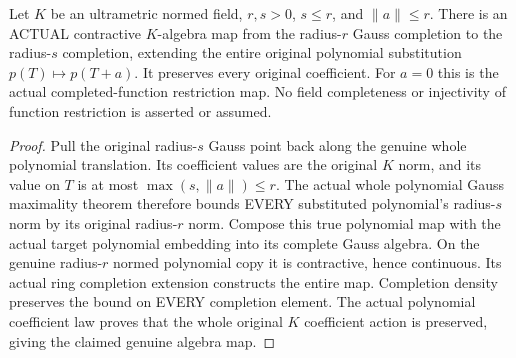 \begin{theorem}
\label{analytic:actual-gauss-disc-restriction}
\leanok
Let $K$ be an ultrametric normed field, $r,s>0$, $s\leq r$, and
$\|a\|\leq r$. There is an ACTUAL contractive $K$-algebra map
from the radius-$r$ Gauss completion to the radius-$s$ completion,
extending the entire original polynomial substitution
$p(T)\mapsto p(T+a)$. It preserves every original coefficient.
For $a=0$ this is the actual completed-function restriction map.
No field completeness or injectivity of function restriction is
asserted or assumed.
\end{theorem}
\begin{proof}
Pull the original radius-$s$ Gauss point back along the genuine
whole polynomial translation. Its coefficient values are the
original $K$ norm, and its value on $T$ is at most
$\max(s,\|a\|)\leq r$. The actual whole polynomial Gauss
maximality theorem therefore bounds EVERY substituted polynomial's
radius-$s$ norm by its original radius-$r$ norm. Compose this
true polynomial map with the actual target polynomial embedding
into its complete Gauss algebra. On the genuine radius-$r$
normed polynomial copy it is contractive, hence continuous.
Its actual ring completion extension constructs the entire map.
Completion density preserves the bound on EVERY completion
element. The actual polynomial coefficient law proves that the
whole original $K$ coefficient action is preserved, giving the
claimed genuine algebra map.
\end{proof}

